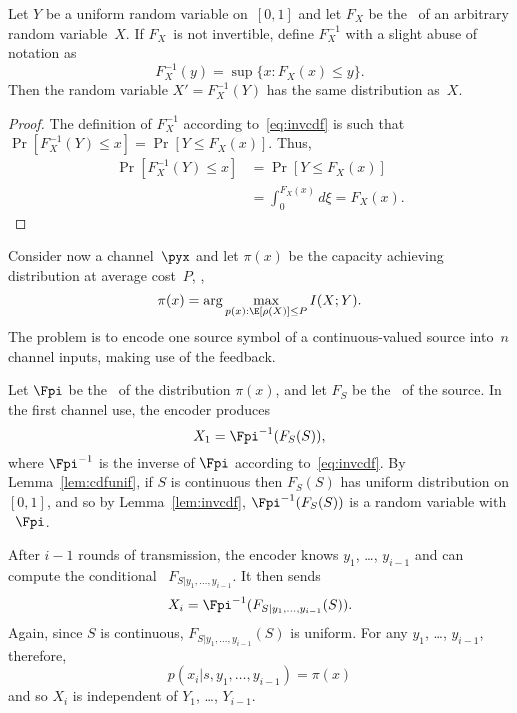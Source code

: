 \begin{lemma}
  \label{lem:invcdf}
  Let $Y$ be a uniform random variable on~$[0,1]$ and let $F_X$ be the \cdf\ of
  an arbitrary random variable~$X$. If $F_X$~is not invertible, define
  $F_X^{-1}$ with a slight abuse of notation as
  \begin{equation}
    \label{eq:invcdf}
    F_X^{-1}(y) = \sup \{x : F_X(x) \le y\}.
  \end{equation}
  Then the random variable $X' = F_X^{-1}(Y)$ has the same distribution as~$X$.
\end{lemma}

\begin{proof}
  The definition of $F_X^{-1}$ according to~\eqref{eq:invcdf} is such
  that $\Pr[F_X^{-1}(Y) \le x] = \Pr[Y \le F_X(x)]$. Thus,
  \begin{align*}
    \Pr[F_X^{-1}(Y) \le x] &= \Pr[Y \le F_X(x)] \\
    &= \int_0^{F_X(x)} d\xi = F_X(x).
  \end{align*}
\end{proof}

Consider now a channel~$\pyx$ and let $\pi(x)$ be the capacity achieving
distribution at average cost~$P$, \ie, 
\begin{equation*}
  \pi(x) = \arg\max_{p(x): \E[\rho(X)] \le P} I(X;Y).
\end{equation*}
The problem is to encode one source symbol of a continuous-valued source
into~$n$ channel inputs, making use of the feedback.

Let $\Fpi$ be the \cdf\ of the distribution $\pi(x)$, and let $F_S$ be the \cdf\
of the source. In the first channel use, the encoder produces
\begin{equation}
  \label{eq:posteriorx1}
  X_1 = \Fpi^{-1}(F_S(S)),
\end{equation}
where $\Fpi^{-1}$ is the inverse of $\Fpi$ according to~\eqref{eq:invcdf}. By
Lemma~\ref{lem:cdfunif}, if $S$ is continuous then $F_S(S)$ has uniform
distribution on $[0,1]$, and so by Lemma~\ref{lem:invcdf}, $\Fpi^{-1}(F_S(S))$
is a random variable with \cdf\ $\Fpi$.

After $i-1$ rounds of transmission, the encoder knows $y_1$, \ldots, $y_{i-1}$
and can compute the conditional \cdf\ $F_{S|y_1, \ldots, y_{i-1}}$. It then
sends
\begin{equation}
  \label{eq:posteriorxi}
  X_i = \Fpi^{-1}(F_{S|y_1,\dots,y_{i-1}}(S)).
\end{equation}
Again, since $S$ is continuous, $F_{S|y_1, \dots, y_{i-1}}(S)$ is uniform. For
any $y_1$, \ldots, $y_{i-1}$, therefore, \begin{equation*}
  p(x_i|s, y_1, \dots, y_{i-1}) = \pi(x)
\end{equation*}
and so $X_i$ is independent of $Y_1$, \ldots, $Y_{i-1}$. 


